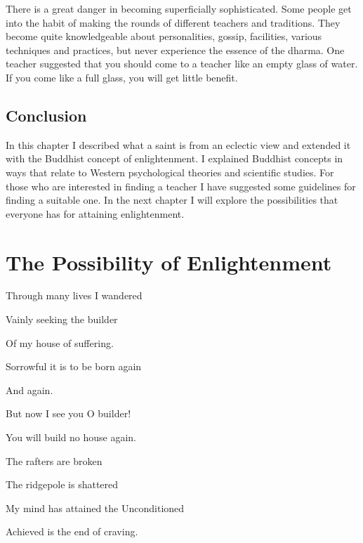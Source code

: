 \documentclass[a5paper,10pt,english]{book}
\begin{document}
\sphinxAtStartPar
There is a great danger in becoming superficially sophisticated. Some
people get into the habit of making the rounds of different teachers and
traditions. They become quite knowledgeable about personalities, gossip,
facilities, various techniques and practices, but never experience the
essence of the dharma. One teacher suggested that you should come to a
teacher like an empty glass of water. If you come like a full glass, you
will get little benefit.


\subsection{Conclusion}
\label{\detokenize{saints:conclusion}}
\sphinxAtStartPar
In this chapter I described what a saint is from an eclectic view and
extended it with the Buddhist concept of enlightenment. I explained
Buddhist concepts in ways that relate to Western psychological theories
and scientific studies. For those who are interested in finding a
teacher I have suggested some guidelines for finding a suitable one. In
the next chapter I will explore the possibilities that everyone has for
attaining enlightenment.


\section{The Possibility of Enlightenment}
\label{\detokenize{saints:the-possibility-of-enlightenment}}
\begin{DUlineblock}{0em}
\item[] 
\item[] Through many lives I wandered
\item[] Vainly seeking the builder
\item[] Of my house of suffering.
\item[] Sorrowful it is to be born again
\item[] And again.
\item[] 
\item[] But now I see you O builder!
\item[] You will build no house again.
\item[] The rafters are broken
\item[] The ridgepole is shattered
\item[] My mind has attained the Unconditioned
\item[] Achieved is the end of craving.
\end{DUlineblock}
\end{document}
